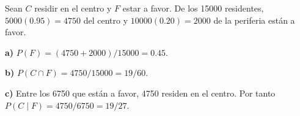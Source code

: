 Sean $C$ residir en el centro y $F$ estar a favor.
De los 15000 residentes, $5000(0.95)=4750$ del centro
y $10000(0.20)=2000$ de la periferia están a favor.

\textbf{a)} $P(F)=(4750+2000)/15000=\boxed{0.45}$.

\textbf{b)} $P(C\cap F)=4750/15000=\boxed{19/60}$.

\textbf{c)} Entre los 6750 que están a favor, 4750 residen
en el centro. Por tanto $P(C\mid F)=4750/6750=\boxed{19/27}$.
